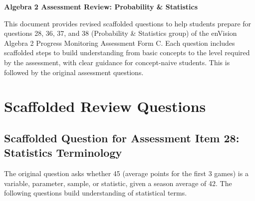 \documentclass[12pt]{article}
\begin{document}
\begin{center}
    \textbf{Algebra 2 Assessment Review: Probability \& Statistics}
\end{center}

This document provides revised scaffolded questions to help students prepare for questions 28, 36, 37, and 38 (Probability \& Statistics group) of the enVision Algebra 2 Progress Monitoring Assessment Form C. Each question includes scaffolded steps to build understanding from basic concepts to the level required by the assessment, with clear guidance for concept-naive students. This is followed by the original assessment questions.

\section*{Scaffolded Review Questions}

\subsection*{Scaffolded Question for Assessment Item 28: Statistics Terminology}
The original question asks whether 45 (average points for the first 3 games) is a variable, parameter, sample, or statistic, given a season average of 42. The following questions build understanding of statistical terms.
\end{document}
